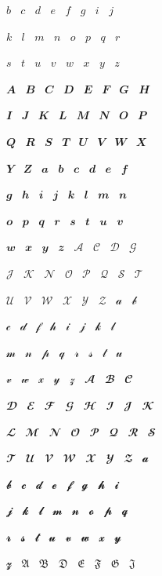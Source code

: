 \documentclass{article}
\begin{document}
$\mitb$ $\mitc$ $\mitd$ $\mite$ $\mitf$ $\mitg$ $\miti$ $\mitj$ \par
$\mitk$ $\mitl$ $\mitm$ $\mitn$ $\mito$ $\mitp$ $\mitq$ $\mitr$ \par
$\mits$ $\mitt$ $\mitu$ $\mitv$ $\mitw$ $\mitx$ $\mity$ $\mitz$ \par
$\mbfitA$ $\mbfitB$ $\mbfitC$ $\mbfitD$ $\mbfitE$ $\mbfitF$ $\mbfitG$ $\mbfitH$ \par
$\mbfitI$ $\mbfitJ$ $\mbfitK$ $\mbfitL$ $\mbfitM$ $\mbfitN$ $\mbfitO$ $\mbfitP$ \par
$\mbfitQ$ $\mbfitR$ $\mbfitS$ $\mbfitT$ $\mbfitU$ $\mbfitV$ $\mbfitW$ $\mbfitX$ \par
$\mbfitY$ $\mbfitZ$ $\mbfita$ $\mbfitb$ $\mbfitc$ $\mbfitd$ $\mbfite$ $\mbfitf$ \par
$\mbfitg$ $\mbfith$ $\mbfiti$ $\mbfitj$ $\mbfitk$ $\mbfitl$ $\mbfitm$ $\mbfitn$ \par
$\mbfito$ $\mbfitp$ $\mbfitq$ $\mbfitr$ $\mbfits$ $\mbfitt$ $\mbfitu$ $\mbfitv$ \par
$\mbfitw$ $\mbfitx$ $\mbfity$ $\mbfitz$ $\mscrA$ $\mscrC$ $\mscrD$ $\mscrG$ \par
$\mscrJ$ $\mscrK$ $\mscrN$ $\mscrO$ $\mscrP$ $\mscrQ$ $\mscrS$ $\mscrT$ \par
$\mscrU$ $\mscrV$ $\mscrW$ $\mscrX$ $\mscrY$ $\mscrZ$ $\mscra$ $\mscrb$ \par
$\mscrc$ $\mscrd$ $\mscrf$ $\mscrh$ $\mscri$ $\mscrj$ $\mscrk$ $\mscrl$ \par
$\mscrm$ $\mscrn$ $\mscrp$ $\mscrq$ $\mscrr$ $\mscrs$ $\mscrt$ $\mscru$ \par
$\mscrv$ $\mscrw$ $\mscrx$ $\mscry$ $\mscrz$ $\mbfscrA$ $\mbfscrB$ $\mbfscrC$ \par
$\mbfscrD$ $\mbfscrE$ $\mbfscrF$ $\mbfscrG$ $\mbfscrH$ $\mbfscrI$ $\mbfscrJ$ $\mbfscrK$ \par
$\mbfscrL$ $\mbfscrM$ $\mbfscrN$ $\mbfscrO$ $\mbfscrP$ $\mbfscrQ$ $\mbfscrR$ $\mbfscrS$ \par
$\mbfscrT$ $\mbfscrU$ $\mbfscrV$ $\mbfscrW$ $\mbfscrX$ $\mbfscrY$ $\mbfscrZ$ $\mbfscra$ \par
$\mbfscrb$ $\mbfscrc$ $\mbfscrd$ $\mbfscre$ $\mbfscrf$ $\mbfscrg$ $\mbfscrh$ $\mbfscri$ \par
$\mbfscrj$ $\mbfscrk$ $\mbfscrl$ $\mbfscrm$ $\mbfscrn$ $\mbfscro$ $\mbfscrp$ $\mbfscrq$ \par
$\mbfscrr$ $\mbfscrs$ $\mbfscrt$ $\mbfscru$ $\mbfscrv$ $\mbfscrw$ $\mbfscrx$ $\mbfscry$ \par
$\mbfscrz$ $\mfrakA$ $\mfrakB$ $\mfrakD$ $\mfrakE$ $\mfrakF$ $\mfrakG$ $\mfrakJ$ \par
\end{document}
